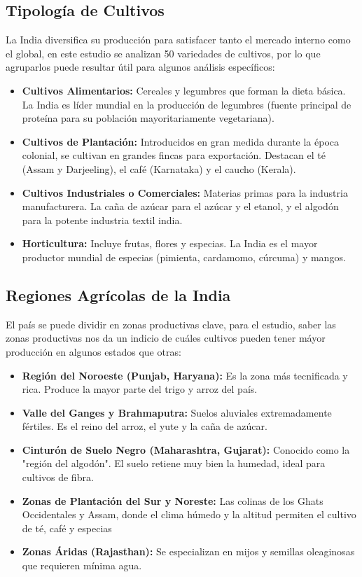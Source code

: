 \documentclass[oneside,11pt]{Latex/Classes/PhDthesisPSnPDF}
\begin{document}
\subsection{Tipología de Cultivos}

La India diversifica su producción para satisfacer tanto el mercado
interno como el global, en este estudio se analizan 50 variedades de
cultivos, por lo que agruparlos puede resultar útil para algunos
análisis específicos:

\begin{itemize}
 \item{\textbf{Cultivos Alimentarios:} Cereales y legumbres que forman la dieta básica. La India es líder mundial en la producción de legumbres (fuente principal de proteína para su población mayoritariamente vegetariana).}
 \item{\textbf{Cultivos de Plantación:} Introducidos en gran medida durante la época colonial, se cultivan en grandes fincas para exportación. Destacan el té (Assam y Darjeeling), el café (Karnataka) y el caucho (Kerala).}
 \item{\textbf{Cultivos Industriales o Comerciales:} Materias primas para la industria manufacturera. La caña de azúcar para el azúcar y el etanol, y el algodón para la potente industria textil india.}
 \item{\textbf{Horticultura:} Incluye frutas, flores y especias. La India es el mayor productor mundial de especias (pimienta, cardamomo, cúrcuma) y mangos.}
\end{itemize}

\hfill\break

\subsection{Regiones Agrícolas de la India}

El país se puede dividir en zonas productivas clave, para el estudio,
saber las zonas productivas nos da un indicio de cuáles cultivos pueden
tener máyor producción en algunos estados que otras:

\begin{itemize}

    \item{\textbf{Región del Noroeste (Punjab, Haryana):} Es la zona más tecnificada y rica. Produce la mayor parte del trigo y arroz del país.}
    \item{\textbf{Valle del Ganges y Brahmaputra:} Suelos aluviales extremadamente fértiles. Es el reino del arroz, el yute y la caña de azúcar.}
    \item{\textbf{Cinturón de Suelo Negro (Maharashtra, Gujarat):} Conocido como la "región del algodón". El suelo retiene muy bien la humedad, ideal para cultivos de fibra.}
    \item{\textbf{Zonas de Plantación del Sur y Noreste:} Las colinas de los Ghats Occidentales y Assam, donde el clima húmedo y la altitud permiten el cultivo de té, café y especias}
    \item{\textbf{Zonas Áridas (Rajasthan):} Se especializan en mijos y semillas oleaginosas que requieren mínima agua.}

\end{itemize}
\end{document}
